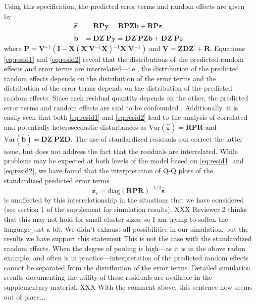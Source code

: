 \documentclass[12pt]{article} %
\newcommand{\al}[1]{{\color{red} #1}}
\newcommand{\inv}{\ensuremath{^{-1}}}
\newcommand{\trans}{\ensuremath{^\prime}}
\newcommand{\var}{\ensuremath{\mathrm{Var}}}
\begin{document}
Using this specification, the predicted error terms and random effects are given by 
%
\begin{align}
\widehat{\bm{\varepsilon}} &= \bm{RPy} = \bm{RPZb} + \bm{RP \varepsilon} \label{eq:resid1}\\
\widehat{\bm{b}} &= \bm{DZ}\trans \bm{Py} = \bm{DZ}\trans \bm{PZb} + \bm{DZ}\trans \bm{P \varepsilon} \label{eq:resid2}
\end{align}
%
where $\bm{P} = \bm{V}\inv( \bm{I} - \bm{X} (\bm{X}\trans \bm{V}\inv \bm{X})\inv \bm{X}\trans \bm{V}\inv)$ \al{and $\bm{V} = \bm{ZDZ}\trans + \bm{R}$}. 
\al{Equations \eqref{eq:resid1} and \eqref{eq:resid2} reveal that the distributions of the predicted random effects and error terms are interrelated---i.e., the distribution of  the predicted random effects depends on the distribution of the error terms and the distribution of the error terms depends on the distribution of the predicted random effects. Since each residual quantity depends on the other, the predicted error terms and random effects are said to be confounded  \citep{HildenMinton:1995wh}.}
Additionally, it is easily seen that both \eqref{eq:resid1} and \eqref{eq:resid2} lead to the analysis of correlated and potentially heteroscedastic disturbances as $\var(\widehat{\bm{\varepsilon}}) = \bm{RPR}$ and $\var(\widehat{\bm{b}}) = \bm{DZ}\trans \bm{PZD}$.
The use of standardized residuals can correct the latter issue, but does not address the fact that the residuals are interrelated. While problems may be expected at both levels of the model based on \eqref{eq:resid1} and \eqref{eq:resid2}, we have found that the interpretation of Q-Q plots of the standardized predicted error terms
%
\[
\bm{z}_{\varepsilon} =  \text{diag} \left(\bm{RPR} \right)^{-1/2} \widehat{\bm{\varepsilon}}
\]
%
is unaffected by this interrelationship \al{in the situations that we have considered (see section 1 of the supplement for simulation results). XXX Reviewer 2 thinks that this may not hold for small cluster sizes, so I am trying to soften the language just a bit. We didn't exhaust all possibilities in our simulation, but the results we have support this statement} This is not the case with the standardized random effects.  When the degree of pooling is high---as it is in the above radon example, and often is in practice---interpretation of the predicted random effects cannot be separated from the distribution of the error terms. Detailed simulation results documenting the utility of  these residuals are available in the supplementary material. \al{XXX With the comment above, this sentence now seems out of place...}
\end{document}
